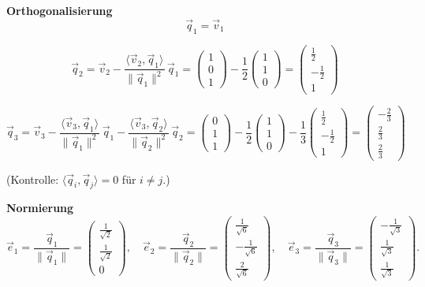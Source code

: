\documentclass[a4paper,11pt,oneside,open=any,parskip=half, DIV=15]{scrreprt}
\begin{document}
   \textbf{Orthogonalisierung}
   \[
      \vec q_1=\vec v_1
   \]

   \[
      \vec q_2=\vec v_2-\frac{\langle \vec v_2,\vec q_1\rangle}{\|\vec q_1\|^2}\,\vec q_1
      =\begin{pmatrix}1\\[2pt]0\\[2pt]1\end{pmatrix}
      -\frac{1}{2}\begin{pmatrix}1\\[2pt]1\\[2pt]0\end{pmatrix}
      =\begin{pmatrix}\tfrac12\\[2pt]-\tfrac12\\[2pt]1\end{pmatrix}
   \]

   \[
      \vec q_3=\vec v_3-\frac{\langle \vec v_3,\vec q_1\rangle}{\|\vec q_1\|^2}\,\vec q_1
      -\frac{\langle \vec v_3,\vec q_2\rangle}{\|\vec q_2\|^2}\,\vec q_2
      =\begin{pmatrix}0\\[2pt]1\\[2pt]1\end{pmatrix}
      -\frac{1}{2}\begin{pmatrix}1\\[2pt]1\\[2pt]0\end{pmatrix}
      -\frac{1}{3}\begin{pmatrix}\tfrac12\\[2pt]-\tfrac12\\[2pt]1\end{pmatrix}
      =\begin{pmatrix}-\tfrac23\\[2pt]\tfrac23\\[2pt]\tfrac23\end{pmatrix}
   \]

   (Kontrolle: \(\langle \vec q_i,\vec q_j\rangle=0\) für \(i\ne j\).)

   \textbf{Normierung}
   \[
      \vec e_1=\frac{\vec q_1}{\|\vec q_1\|}=\begin{pmatrix}\tfrac{1}{\sqrt2}\\[2pt]\tfrac{1}{\sqrt2}\\[2pt]0\end{pmatrix},\quad
      \vec e_2=\frac{\vec q_2}{\|\vec q_2\|}=\begin{pmatrix}\tfrac{1}{\sqrt6}\\[2pt]-\tfrac{1}{\sqrt6}\\[2pt]\tfrac{2}{\sqrt6}\end{pmatrix},\quad
      \vec e_3=\frac{\vec q_3}{\|\vec q_3\|}=\begin{pmatrix}-\tfrac{1}{\sqrt3}\\[2pt]\tfrac{1}{\sqrt3}\\[2pt]\tfrac{1}{\sqrt3}\end{pmatrix}.
   \]
\end{document}
